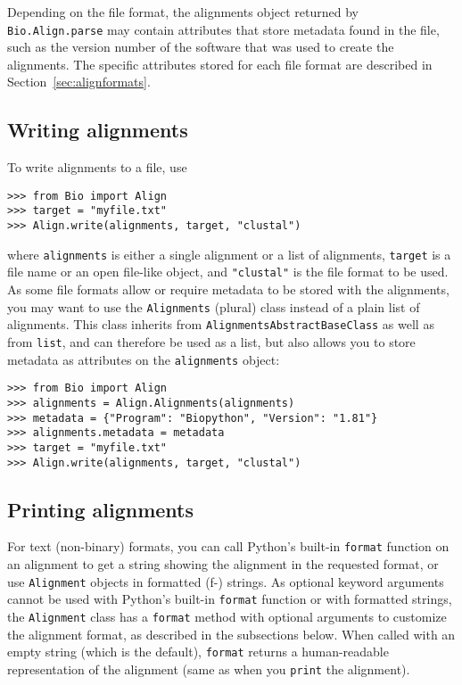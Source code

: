 Depending on the file format, the alignments object returned by \verb|Bio.Align.parse| may contain attributes that store metadata found in the file, such as the version number of the software that was used to create the alignments. The specific attributes stored for each file format are described in Section~\ref{sec:alignformats}.

\subsection{Writing alignments}
\label{subsec:align_writing}

To write alignments to a file, use
\begin{verbatim}
>>> from Bio import Align
>>> target = "myfile.txt"
>>> Align.write(alignments, target, "clustal")
\end{verbatim}
where \verb|alignments| is either a single alignment or a list of alignments, \verb|target| is a file name or an open file-like object, and \verb|"clustal"| is the file format to be used. As some file formats allow or require metadata to be stored with the alignments, you may want to use the \verb|Alignments| (plural) class instead of a plain list of alignments. This class inherits from \verb|AlignmentsAbstractBaseClass| as well as from \verb|list|, and can therefore be used as a list, but also allows you to store metadata as attributes on the \verb|alignments| object:
\begin{verbatim}
>>> from Bio import Align
>>> alignments = Align.Alignments(alignments)
>>> metadata = {"Program": "Biopython", "Version": "1.81"}
>>> alignments.metadata = metadata
>>> target = "myfile.txt"
>>> Align.write(alignments, target, "clustal")
\end{verbatim}

\subsection{Printing alignments}
\label{subsec:align_printing}

For text (non-binary) formats, you can call Python's built-in \verb|format| function on an alignment to get a string showing the alignment in the requested format, or use \verb|Alignment| objects in formatted (f-) strings. As optional keyword arguments cannot be used with Python's built-in \verb|format| function or with formatted strings, the \verb|Alignment| class has a \verb|format| method with optional arguments to customize the alignment format, as described in the subsections below. When called with an empty string (which is the default), \verb|format| returns a human-readable representation of the alignment (same as when you \verb|print| the alignment).

